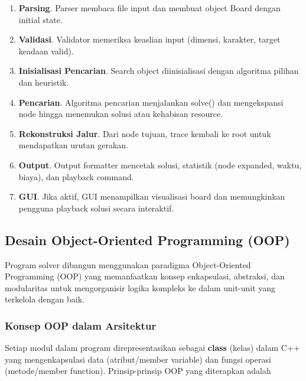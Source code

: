 \begin{enumerate}
    \item \textbf{Parsing}. Parser membaca file input dan membuat object Board dengan initial state.
    \item \textbf{Validasi}. Validator memeriksa keaslian input (dimensi, karakter, target keadaan valid).
    \item \textbf{Inisialisasi Pencarian}. Search object diinisialisasi dengan algoritma pilihan dan heuristik.
    \item \textbf{Pencarian}. Algoritma pencarian menjalankan solve() dan mengekspansi node hingga menemukan solusi atau kehabisan resource.
    \item \textbf{Rekonstruksi Jalur}. Dari node tujuan, trace kembali ke root untuk mendapatkan urutan gerakan.
    \item \textbf{Output}. Output formatter mencetak solusi, statistik (node expanded, waktu, biaya), dan playback command.
    \item \textbf{GUI}. Jika aktif, GUI menampilkan visualisasi board dan memungkinkan pengguna playback solusi secara interaktif.
\end{enumerate}

\subsection{Desain Object-Oriented Programming (OOP)}

Program solver dibangun menggunakan paradigma Object-Oriented Programming (OOP) yang memanfaatkan konsep enkapsulasi, abstraksi, dan modularitas untuk mengorganisir logika kompleks ke dalam unit-unit yang terkelola dengan baik.

\subsubsection{Konsep OOP dalam Arsitektur}

Setiap modul dalam program direpresentasikan sebagai \textbf{class} (kelas) dalam C++ yang mengenkapsulasi data (atribut/member variable) dan fungsi operasi (metode/member function). Prinsip-prinsip OOP yang diterapkan adalah

